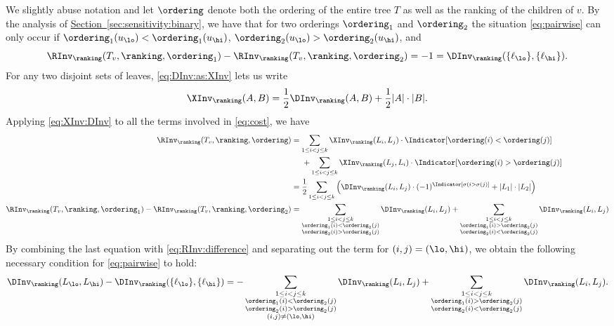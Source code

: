 \documentclass[11pt]{article}
\numberwithin{equation}{section}
\theoremstyle{definition}
\theoremstyle{plain}
\newcommand{\expref}[2]{\hyperref[#2]{#1~\ref{#2}}}
\begin{document}
We slightly abuse notation and  let $\ordering$ denote both the ordering of the entire tree $T$ as well as the ranking of the children of $v$. By the analysis of \expref{Section}{sec:sensitivity:binary}, we have that for two orderings $\ordering_1$ and $\ordering_2$ the situation \eqref{eq:pairwise} can only occur if $\ordering_1(u_\lo) < \ordering_1(u_\hi)$, $\ordering_2(u_\lo) > \ordering_2(u_\hi)$, and 
\begin{equation}\label{eq:RInv:difference}
\RInv_\ranking(T_v,\ranking,\ordering_1) -
\RInv_\ranking(T_v,\ranking,\ordering_2) = -1 = \DInv_\ranking(\{\ell_\lo\},\{\ell_\hi\}).
\end{equation}
For any two disjoint sets of leaves, \eqref{eq:DInv:as:XInv} lets us write 
\begin{equation}\label{eq:XInv:DInv}
\XInv_\ranking(A,B) =  \frac{1}{2} \DInv_\ranking(A,B) + \frac{1}{2} |A| \cdot |B|.
\end{equation}
Applying \eqref{eq:XInv:DInv} to all the terms involved in \eqref{eq:cost}, we have
\begin{align*}
\RInv_\ranking(T_v,\ranking,\ordering) 
& = \sum_{1 \le i < j \le k} \XInv_\ranking(L_i,L_j) \cdot \Indicator[\ordering(i) < \ordering(j)] \\
& \;\;\;\;\; + \sum_{1 \le i < j \le k} \XInv_\ranking(L_j,L_i) \cdot \Indicator[\ordering(i) > \ordering(j)] \\
& = \frac{1}{2} \sum_{1 \le i < j \le k} \left( \DInv_\ranking(L_i,L_j) \cdot (-1)^{\Indicator[\sigma(i > \sigma(j)]} + |L_1| \cdot |L_2| \right) \\
\RInv_\ranking(T_v,\ranking,\ordering_1) -
\RInv_\ranking(T_v,\ranking,\ordering_2)
& = 
\sum\limits_{\substack{1 \le i < j \le k \\ \ordering_1(i) < \ordering_2(j) \\ \ordering_2(i) > \ordering_2(j)}}\DInv_\ranking(L_i,L_j)
+ \sum\limits_{\substack{1 \le i < j \le k \\ \ordering_1(i) > \ordering_2(j) \\ \ordering_2(i) < \ordering_2(j)}} \DInv_\ranking(L_i,L_j)
\end{align*}
By combining the last equation with \eqref{eq:RInv:difference} and separating out the term for $(i,j)=(\lo,\hi)$, we obtain the following necessary condition for \eqref{eq:pairwise} to hold:
\begin{equation}\label{eq:necessary}
\DInv_\ranking(L_\lo,L_\hi) - \DInv_\ranking(\{\ell_\lo\},\{\ell_\hi\})
= -\sum\limits_{\substack{1 \le i < j \le k \\ \ordering_1(i) < \ordering_2(j) \\ \ordering_2(i) > \ordering_2(j) \\ (i,j) \ne (\lo,\hi)}} \DInv_\ranking(L_i,L_j)
+ \sum\limits_{\substack{1 \le i < j \le k \\ \ordering_1(i) > \ordering_2(j) \\ \ordering_2(i) < \ordering_2(j)}} \DInv_\ranking(L_i,L_j).
\end{equation} 
\end{document}
